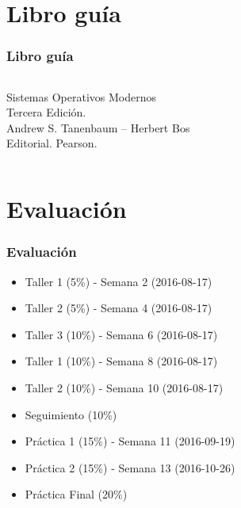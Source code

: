 \documentclass[xcolor=svgnames]{beamer}
\theoremstyle{example}
\begin{document}
\section{Libro guía}

\begin{frame}
  \frametitle{Libro guía}
  \begin{columns}
    \begin{column}{0.5\textwidth}
      Sistemas Operativos Modernos
      \\
      Tercera Edición.
      \\
      Andrew S. Tanenbaum -- Herbert Bos
      \\
      Editorial. Pearson.
    \end{column}
    \begin{column}{0.5\textwidth}

    \end{column}
  \end{columns}
\end{frame}

\section{Evaluación}

\begin{frame}
  \frametitle{Evaluación}
  \begin{itemize}%
  \item Taller 1 (5\%) - Semana 2  (2016-08-17)
  \item Taller 2 (5\%) - Semana 4  (2016-08-17)
  \item Taller 3 (10\%) - Semana 6  (2016-08-17)
  \item Taller 1 (10\%) - Semana 8  (2016-08-17)
  \item Taller 2 (10\%) - Semana 10  (2016-08-17)
  \item Seguimiento (10\%) 
  \item Práctica 1 (15\%) - Semana 11 (2016-09-19)
  \item Práctica 2 (15\%) - Semana 13 (2016-10-26)
  \item Práctica Final (20\%)
  \end{itemize}
\end{frame}


\end{document}
